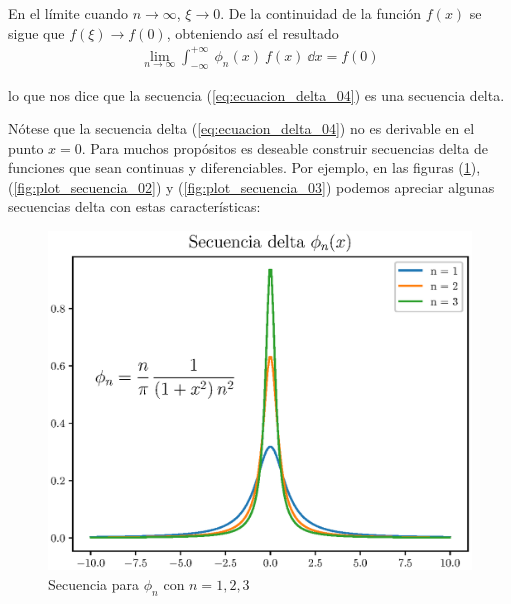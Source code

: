 En el límite cuando $n \to \infty$, $\xi \to 0$. De la continuidad de la función $f(x)$ se sigue que $f(\xi) \to f(0)$, obteniendo así el resultado
\begin{align*}
\lim_{n \to \infty} \int_{-\infty}^{+ \infty} \: \phi_{n}(x) \: f(x) \: \dd{x} = f(0)
\end{align*}

lo que nos dice que la secuencia (\ref{eq:ecuacion_delta_04}) es una secuencia delta.
\par
Nótese que la secuencia delta (\ref{eq:ecuacion_delta_04}) no es derivable en el punto $x = 0$. Para muchos propósitos es deseable
construir secuencias delta de funciones que sean continuas y diferenciables. Por ejemplo, en las figuras (\ref{fig:plot_secuencia_01}), (\ref{fig:plot_secuencia_02}) y (\ref{fig:plot_secuencia_03}) podemos apreciar algunas secuencias delta con estas características:

\begin{figure}[H]
    \centering
    \includegraphics[scale=0.8]{Imagenes/secuencia_delta_01.eps}
    \caption{Secuencia para $\phi_{n}$ con $n=1,2,3$}
    \label{fig:plot_secuencia_01}
\end{figure}


